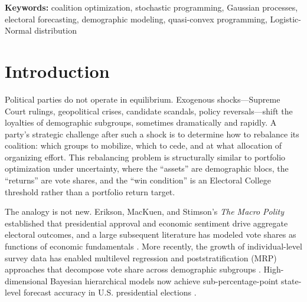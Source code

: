 \documentclass[12pt, letterpaper]{article}
\theoremstyle{definition}
\newcommand{\SigmaDelta}{\Sigma_{\Delta}}
\begin{document}
\begin{abstract}
own predictions; a three-way elimination analysis (aggregation, covariance,
training-corpus imbalance) localizes it to the base model's pretrained political
priors, which survive light LoRA adaptation, and we disclose it as a limitation
rather than tuning it away. The race-bloc covariance $\SigmaDelta$ is
estimated by Ledoit-Wolf shrinkage over a restricted nine-cycle window
(1992--2024) that suppresses spurious variance from sparse pre-1990 minority-bloc
cells (Asian standard deviation $0.243 \rightarrow 0.122$). Electoral College
asymmetry analysis places the Democrat win threshold at 50.66\% of the two-party
popular vote versus 49.34\% for Republicans; this threshold is an empirical
estimate subject to ongoing validation (Section~\ref{sec:veq_results}).
Finally, the full three-stage pipeline is deployed as a live web application:
a GPU-backed streaming inference service (Modal A10G) feeds a Next.js interface
that renders post-shock coalition weights, a win-probability gauge with credible
interval, and an analyst dashboard, returning results progressively as each
pipeline stage completes.
\end{abstract}

\bigskip
\noindent\textbf{Keywords:} coalition optimization, stochastic programming, Gaussian
processes, electoral forecasting, demographic modeling, quasi-convex programming,
Logistic-Normal distribution

\newpage

\section{Introduction}
\label{sec:intro}

Political parties do not operate in equilibrium. Exogenous shocks---Supreme Court
rulings, geopolitical crises, candidate scandals, policy reversals---shift the
loyalties of demographic subgroups, sometimes dramatically and rapidly. A party's
strategic challenge after such a shock is to determine how to rebalance its
coalition: which groups to mobilize, which to cede, and at what allocation of
organizing effort. This rebalancing problem is structurally similar to portfolio
optimization under uncertainty, where the ``assets'' are demographic blocs, the
``returns'' are vote shares, and the ``win condition'' is an Electoral College
threshold rather than a portfolio return target.

The analogy is not new. Erikson, MacKuen, and Stimson's \citeyear{EriksonEtAl2002}
\textit{The Macro Polity} established that presidential approval and economic
sentiment drive aggregate electoral outcomes, and a large subsequent literature has
modeled vote shares as functions of economic fundamentals
\citep{Abramowitz2008, Hibbs2012}. More recently, the growth of individual-level
survey data has enabled multilevel regression and poststratification (MRP) approaches
that decompose vote share across demographic subgroups \citep{GelmanLittle1997,
Park2004, Lax2009}. High-dimensional Bayesian hierarchical models now achieve
sub-percentage-point state-level forecast accuracy in U.S. presidential elections
\citep{Linzer2013, Economist2020}.
\end{document}
